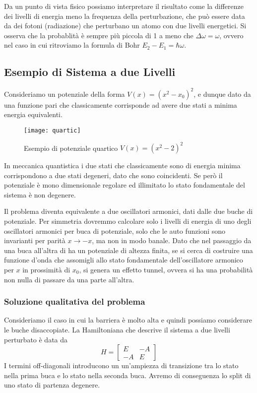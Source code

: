 Da un punto di vista fisico possiamo interpretare il risultato come la differenze dei livelli di energia meno la frequenza della perturbazione, che pu\`o essere data da dei fotoni (radiazione) che perturbano un atomo con due livelli energetici. Si osserva che la probablit\`a \`e sempre pi\`u piccola di 1 a meno che $\Delta \omega = \omega$, ovvero nel caso in cui ritroviamo la formula di Bohr $E_2 - E_1 = \hbar \omega $.

\subsection{Esempio di Sistema a due Livelli}

Consideriamo un potenziale della forma $V(x) = (x^2-x_0)^2$, e dunque dato da una funzione pari che classicamente corrisponde ad avere due stati a minima energia equivalenti.
\newpage 

\begin{figure}[!ht]
\vspace{0.1in}
\texttt{[image: quartic]}	
\centering
\vspace{0.1in}
\caption{Esempio di potenziale quartico $V(x) = (x^2-2)^2$}
\end{figure}

In meccanica quantistica i due stati che classicamente sono di energia minima corrispondono a due stati degeneri, dato che sono coincidenti. Se per\`o il potenziale \`e mono dimensionale regolare ed illimitato  lo stato fondamentale del sistema \`e non degenere. 

Il problema diventa equivalente a due oscillatori armonici, dati dalle due buche di potenziale. Per simmetria dovremmo calcolare solo i livelli di energia di uno degli oscillatori armonici per buca di potenziale, solo che le auto funzioni sono invarianti per parit\`a $x \to -x$, ma non in modo banale. Dato che nel passaggio da una buca all'altra di ha un potenziale di altezza finita, se si cerca di costruire una funzione d'onda che assomigli allo stato fondamentale dell'oscillatore armonico per $x$ in prossimit\`a di $x_0$, si genera un effetto tunnel, ovvera si ha una probabilit\`a non nulla di passare da una parte all'altra.

\subsubsection{Soluzione qualitativa del problema}

Consideriamo il caso in cui la barriera \`e molto alta e quindi possiamo considerare le buche  disaccopiate. La Hamiltoniana che descrive il sistema a due livelli perturbato \`e data da 
\begin{equation*}
	H = \left [\begin{array}{cc}
		E & - A \\
		-A & E
	\end{array}\right ]
\end{equation*} 
I termini off-diagonali introducono un un'ampiezza di transizione tra lo stato nella prima buca  e lo stato nella seconda buca. Avremo di conseguenza lo split di uno stato di partenza degenere. 

